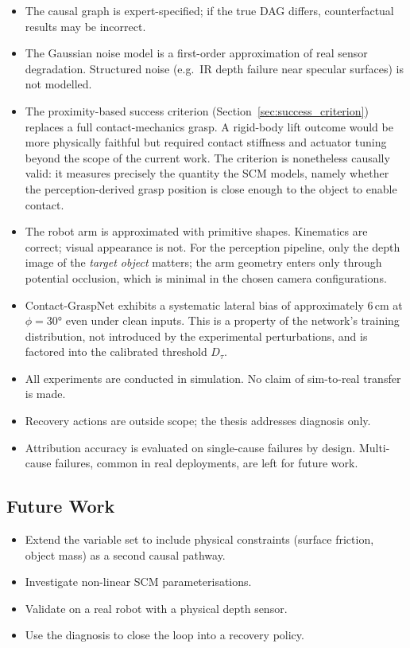 \documentclass[journal]{IEEEtran}
\begin{document}
\begin{itemize}
  \item The causal graph is expert-specified; if the true DAG
        differs, counterfactual results may be incorrect.
  \item The Gaussian noise model is a first-order approximation
        of real sensor degradation.  Structured noise (e.g.\
        IR depth failure near specular surfaces) is not modelled.
  \item The proximity-based success criterion
        (Section~\ref{sec:success_criterion}) replaces a full
        contact-mechanics grasp.  A rigid-body lift outcome would
        be more physically faithful but required contact stiffness
        and actuator tuning beyond the scope of the current work.
        The criterion is nonetheless causally valid: it measures
        precisely the quantity the SCM models, namely whether the
        perception-derived grasp position is close enough to the
        object to enable contact.
  \item The robot arm is approximated with primitive shapes.
        Kinematics are correct; visual appearance is not. For
        the perception pipeline, only the depth image of the
        \emph{target object} matters; the arm geometry enters
        only through potential occlusion, which is minimal in
        the chosen camera configurations.
  \item Contact-GraspNet exhibits a systematic lateral bias of
        approximately 6\,cm at $\phi = 30°$ even under clean
        inputs.  This is a property of the network's training
        distribution, not introduced by the experimental
        perturbations, and is factored into the calibrated
        threshold $D_\tau$.
  \item All experiments are conducted in simulation.  No claim
        of sim-to-real transfer is made.
  \item Recovery actions are outside scope; the thesis addresses
        diagnosis only.
  \item Attribution accuracy is evaluated on single-cause
        failures by design.  Multi-cause failures, common in
        real deployments, are left for future work.
\end{itemize}

\subsection{Future Work}

\begin{itemize}
  \item Extend the variable set to include physical constraints
        (surface friction, object mass) as a second causal pathway.
  \item Investigate non-linear SCM parameterisations.
  \item Validate on a real robot with a physical depth sensor.
  \item Use the diagnosis to close the loop into a recovery policy.
\end{itemize}
\end{document}
